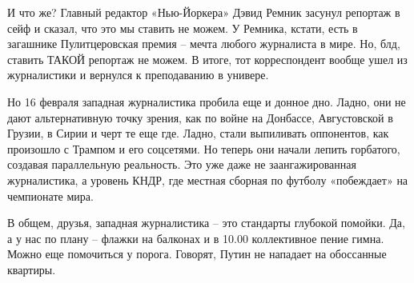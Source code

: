 И что же? Главный редактор «Нью-Йоркера» Дэвид Ремник засунул репортаж в сейф и
сказал, что это мы ставить не можем. У Ремника, кстати, есть в загашнике
Пулитцеровская премия – мечта любого журналиста в мире. Но, блд, ставить ТАКОЙ
репортаж не можем. В итоге, тот корреспондент вообще ушел из журналистики и
вернулся к преподаванию в универе.

Но 16 февраля западная журналистика пробила еще и донное дно. Ладно, они не
дают альтернативную точку зрения, как по войне на Донбассе, Августовской в
Грузии, в Сирии и черт те еще где. Ладно, стали выпиливать оппонентов, как
произошло с Трампом и его соцсетями. Но теперь они начали лепить горбатого,
создавая параллельную реальность. Это уже даже не заангажированная
журналистика, а уровень КНДР, где местная сборная по футболу «побеждает» на
чемпионате мира.

В общем, друзья, западная журналистика – это стандарты глубокой помойки. Да, а
у нас по плану – флажки на балконах и в 10.00 коллективное пение гимна. Можно
еще помочиться у порога. Говорят, Путин не нападает на обоссанные квартиры.
